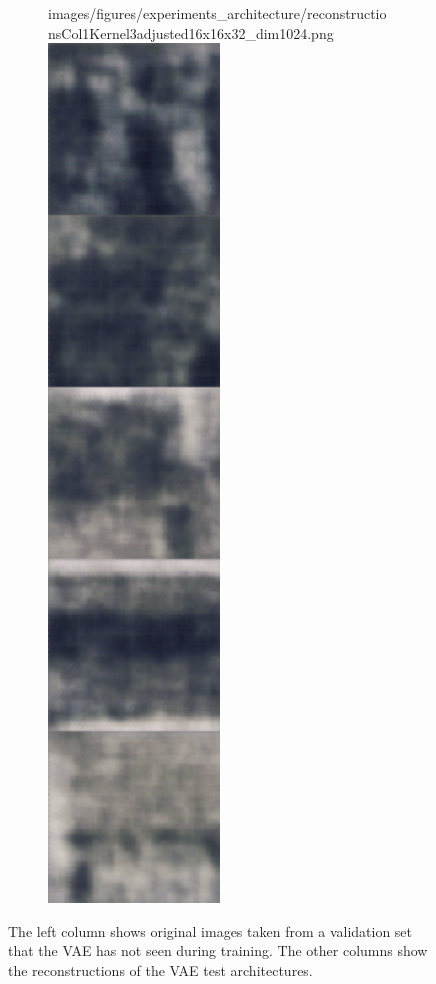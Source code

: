 \begin{figure}[H]
\begin{subfigure}[t]{.19\textwidth}
        {images/figures/experiments_architecture/reconstructionsCol1Kernel3adjusted16x16x32_dim1024.png}\hfill
        \includegraphics[width=0.5\textwidth]
        {images/figures/experiments_architecture/reconstructionsCol2Kernel3adjusted16x16x32_dim1024.png}
        \caption{}
    \end{subfigure}
    \caption{The left column shows original images taken from a validation set that the VAE has not seen during
    training. The other columns show the reconstructions of the VAE test architectures.} \label{figure_reconstructions_1}
\end{figure} 

